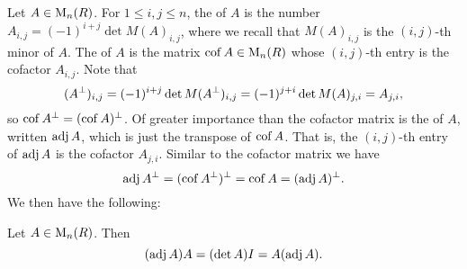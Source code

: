 Let $A \in \mathrm{M}_{n}(R)$. For $1 \leq i,j \leq n$, the  of $A$ is the number $A_{i,j} = (-1)^{i+j} \det M(A)_{i,j}$, where we recall that $M(A)_{i,j}$ is the $(i,j)$-th minor of $A$. The  of $A$ is the matrix $\operatorname{cof} A \in \mathrm{M}_{n}(R)$ whose $(i,j)$-th entry is the cofactor $A_{i,j}$. Note that
%
\begin{equation*}
    (A^\bot)_{i,j}
        = (-1)^{i+j} \det M(A^\bot)_{i,j}
        = (-1)^{j+i} \det M(A)_{j,i}
        = A_{j,i},
\end{equation*}
%
so $\operatorname{cof} A^\bot = (\operatorname{cof} A)^\bot$. Of greater importance than the cofactor matrix is the  of $A$, written $\operatorname{adj} A$, which is just the transpose of $\operatorname{cof} A$. That is, the $(i,j)$-th entry of $\operatorname{adj} A$ is the cofactor $A_{j,i}$. Similar to the cofactor matrix we have
%
\begin{equation*}
    \operatorname{adj} A^\bot
        = (\operatorname{cof} A^\bot)^\bot
        = \operatorname{cof} A
        = (\operatorname{adj} A)^\bot.
\end{equation*}
%
We then have the following:

\begin{proposition}
    \label{thm:adjoint-matrix-product}
    Let $A \in \mathrm{M}_{n}(R)$. Then
    \begin{equation*}
        (\operatorname{adj} A) A
            = (\det A) I
            = A (\operatorname{adj} A).
    \end{equation*}
\end{proposition}

